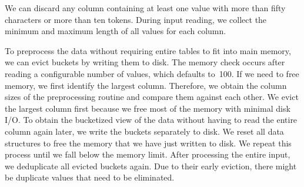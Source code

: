 We can discard any column containing at least one value with more than fifty characters or more than ten tokens.
During input reading, we collect the minimum and maximum length of all values for each column.

To preprocess the data without requiring entire tables to fit into main memory, we can evict buckets by writing them to disk.
The memory check occurs after reading a configurable number of values, which defaults to~100.
If we need to free memory, we first identify the largest column.
Therefore, we obtain the column sizes of the preprocessing routine and compare them against each other.
We evict the largest column first because we free most of the memory with minimal disk I/O.
To obtain the bucketized view of the data without having to read the entire column again later, we write the buckets separately to disk.
We reset all data structures to free the memory that we have just written to disk.
We repeat this process until we fall below the memory limit.
After processing the entire input, we deduplicate all evicted buckets again.
Due to their early eviction, there might be duplicate values that need to be eliminated.

